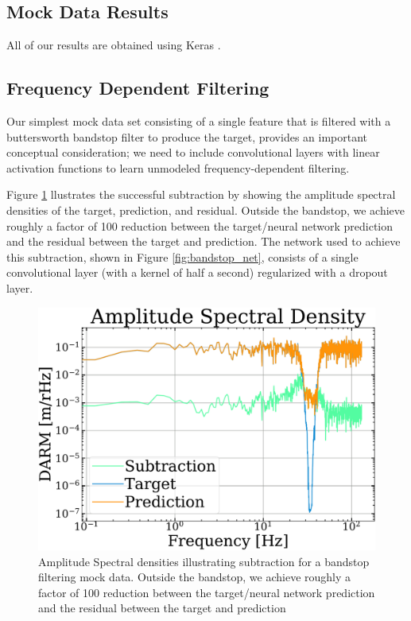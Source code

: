 \begin{refsection}
\section{Mock Data Results}

All of our results are obtained using Keras \cite{chollet2015keras}.

\subsection{Frequency Dependent Filtering}

Our simplest mock data set consisting of a single feature that is filtered with a buttersworth bandstop filter to produce the target, provides an important conceptual consideration; we need to include convolutional layers with linear activation functions to learn unmodeled frequency-dependent filtering. 

Figure \ref{fig:bandstop_ASD} llustrates the successful subtraction by showing the amplitude spectral densities of the target, prediction, and residual. Outside the bandstop, we achieve roughly a factor of 100 reduction between the target/neural network prediction and the residual between the target and prediction.
The network used to achieve this subtraction, shown in Figure \ref{fig:bandstop_net}, consists of a single convolutional layer (with a kernel of half a second) regularized with a dropout layer.

\begin{figure}[htbp]
   \centering
   \includegraphics[width=\columnwidth]{chapter_noise_sub/etc/bandstop_ASD}
   \caption{Amplitude Spectral densities illustrating subtraction for a bandstop filtering mock data. Outside the bandstop, we achieve roughly a factor of 100 reduction between the target/neural network prediction and the residual between the target and prediction}
   \label{fig:bandstop_ASD}
\end{figure}


\end{refsection}
